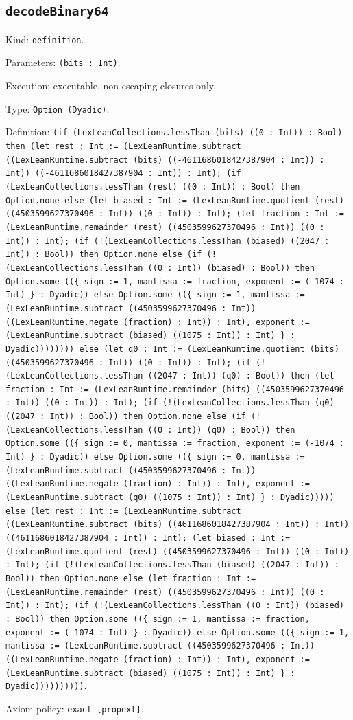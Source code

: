 \documentclass[11pt]{article}
\begin{document}
\subsection*{\texttt{decodeBinary64}}
\noindent Kind: \texttt{definition}.\par
\noindent Parameters: \texttt{(bits : Int)}.\par
\noindent Execution: executable, non-escaping closures only.\par
\noindent Type: \texttt{Option (Dyadic)}.\par
\noindent Definition: \texttt{(if (LexLeanCollections.lessThan (bits) ((0 : Int)) : Bool) then (let rest : Int := (LexLeanRuntime.subtract ((LexLeanRuntime.subtract (bits) ((-4611686018427387904 : Int)) : Int)) ((-4611686018427387904 : Int)) : Int); (if (LexLeanCollections.lessThan (rest) ((0 : Int)) : Bool) then Option.none else (let biased : Int := (LexLeanRuntime.quotient (rest) ((4503599627370496 : Int)) ((0 : Int)) : Int); (let fraction : Int := (LexLeanRuntime.remainder (rest) ((4503599627370496 : Int)) ((0 : Int)) : Int); (if (!(LexLeanCollections.lessThan (biased) ((2047 : Int)) : Bool)) then Option.none else (if (!(LexLeanCollections.lessThan ((0 : Int)) (biased) : Bool)) then Option.some ((\{ sign := 1, mantissa := fraction, exponent := (-1074 : Int) \} : Dyadic)) else Option.some ((\{ sign := 1, mantissa := (LexLeanRuntime.subtract ((4503599627370496 : Int)) ((LexLeanRuntime.negate (fraction) : Int)) : Int), exponent := (LexLeanRuntime.subtract (biased) ((1075 : Int)) : Int) \} : Dyadic)))))))) else (let q0 : Int := (LexLeanRuntime.quotient (bits) ((4503599627370496 : Int)) ((0 : Int)) : Int); (if (!(LexLeanCollections.lessThan ((2047 : Int)) (q0) : Bool)) then (let fraction : Int := (LexLeanRuntime.remainder (bits) ((4503599627370496 : Int)) ((0 : Int)) : Int); (if (!(LexLeanCollections.lessThan (q0) ((2047 : Int)) : Bool)) then Option.none else (if (!(LexLeanCollections.lessThan ((0 : Int)) (q0) : Bool)) then Option.some ((\{ sign := 0, mantissa := fraction, exponent := (-1074 : Int) \} : Dyadic)) else Option.some ((\{ sign := 0, mantissa := (LexLeanRuntime.subtract ((4503599627370496 : Int)) ((LexLeanRuntime.negate (fraction) : Int)) : Int), exponent := (LexLeanRuntime.subtract (q0) ((1075 : Int)) : Int) \} : Dyadic))))) else (let rest : Int := (LexLeanRuntime.subtract ((LexLeanRuntime.subtract (bits) ((4611686018427387904 : Int)) : Int)) ((4611686018427387904 : Int)) : Int); (let biased : Int := (LexLeanRuntime.quotient (rest) ((4503599627370496 : Int)) ((0 : Int)) : Int); (if (!(LexLeanCollections.lessThan (biased) ((2047 : Int)) : Bool)) then Option.none else (let fraction : Int := (LexLeanRuntime.remainder (rest) ((4503599627370496 : Int)) ((0 : Int)) : Int); (if (!(LexLeanCollections.lessThan ((0 : Int)) (biased) : Bool)) then Option.some ((\{ sign := 1, mantissa := fraction, exponent := (-1074 : Int) \} : Dyadic)) else Option.some ((\{ sign := 1, mantissa := (LexLeanRuntime.subtract ((4503599627370496 : Int)) ((LexLeanRuntime.negate (fraction) : Int)) : Int), exponent := (LexLeanRuntime.subtract (biased) ((1075 : Int)) : Int) \} : Dyadic))))))))))}.\par
\noindent Axiom policy: \texttt{exact [propext]}.\par
\end{document}

